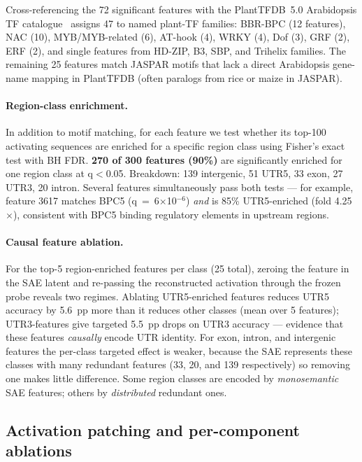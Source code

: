 \documentclass[11pt, a4paper]{article}
\begin{document}
Cross-referencing the 72 significant features with the PlantTFDB~5.0
Arabidopsis TF catalogue~\citep{tian2020plantregmap} assigns 47 to named
plant-TF families: BBR-BPC (12 features), NAC (10), MYB/MYB-related (6),
AT-hook (4), WRKY (4), Dof (3), GRF (2), ERF (2), and single features from
HD-ZIP, B3, SBP, and Trihelix families. The remaining 25 features match
JASPAR motifs that lack a direct Arabidopsis gene-name mapping in
PlantTFDB (often paralogs from rice or maize in JASPAR).

\paragraph{Region-class enrichment.}
In addition to motif matching, for each feature we test whether its
top-100 activating sequences are enriched for a specific region class
using Fisher's exact test with BH FDR. \textbf{270 of 300 features (90\%)}
are significantly enriched for one region class at q$<$0.05. Breakdown:
139 intergenic, 51 UTR5, 33 exon, 27 UTR3, 20 intron. Several features
simultaneously pass both tests --- for example, feature 3617 matches BPC5
(q~=~6$\times$10$^{-6}$) \emph{and} is 85\% UTR5-enriched (fold
4.25$\times$), consistent with BPC5 binding regulatory elements in
upstream regions.

\paragraph{Causal feature ablation.}
For the top-5 region-enriched features per class (25 total), zeroing the
feature in the SAE latent and re-passing the reconstructed activation
through the frozen probe reveals two regimes. Ablating UTR5-enriched
features reduces UTR5 accuracy by 5.6~pp more than it reduces other
classes (mean over 5 features); UTR3-features give targeted 5.5~pp drops
on UTR3 accuracy --- evidence that these features \emph{causally} encode
UTR identity. For exon, intron, and intergenic features the per-class
targeted effect is weaker, because the SAE represents these classes with
many redundant features (33, 20, and 139 respectively) so removing one
makes little difference. Some region classes are encoded by
\emph{monosemantic} SAE features; others by \emph{distributed}
redundant ones.

\subsection*{Activation patching and per-component ablations}
\label{sec:mechanistic}
\end{document}
